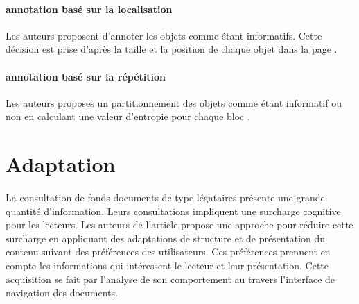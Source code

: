 \documentclass[french]{book}
\begin{document}
\paragraph*{annotation basé sur la localisation} Les auteurs proposent d'annoter les objets comme étant informatifs. Cette décision est prise d'après la taille et la position de chaque objet dans la page \citep{wininformative}. 

\paragraph*{annotation basé sur la répétition} Les auteurs proposes un partitionnement des objets comme étant informatif ou non en calculant une valeur d'entropie pour chaque bloc \citep{lin2002discovering}.
\

\section{Adaptation}
La consultation de fonds documents de type légataires présente une grande quantité d'information. Leurs consultations impliquent une surcharge cognitive pour les lecteurs. Les auteurs de l'article \citep{zayani2010adaptation} propose une approche pour réduire cette surcharge en appliquant des adaptations de structure et de présentation du contenu suivant des préférences des utilisateurs. Ces préférences prennent en compte les informations qui intéressent le lecteur et leur présentation. Cette acquisition se fait par l'analyse de son comportement au travers l'interface de navigation des documents. 




\end{document}
